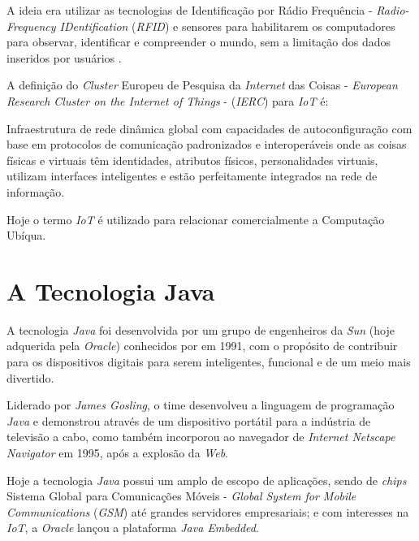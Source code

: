 A ideia era utilizar as tecnologias de Identificação por Rádio Frequência -
\textit{Radio-Frequency IDentification} (\textit{RFID}) e sensores para
habilitarem os computadores para observar, identificar e compreender o mundo,
sem a limitação dos dados inseridos por usuários \cite{kevinashton2009}.

\newpage
A definição do \textit{Cluster} Europeu de Pesquisa da \textit{Internet} das
Coisas - \textit{European Research Cluster on the Internet of Things} -
(\textit{IERC}) \cite[p. ~26]{iangsmith2012} para \textit{IoT} é:

\begin{citacao}
    Infraestrutura de rede dinâmica global com capacidades de autoconfiguração
    com base em protocolos de comunicação padronizados e interoperáveis onde as
    coisas físicas e virtuais têm identidades, atributos físicos,
    personalidades virtuais, utilizam interfaces inteligentes e estão
    perfeitamente integrados na rede de informação.
\end{citacao}

Hoje o termo \textit{IoT} é utilizado para relacionar comercialmente a
Computação Ubíqua.

\section{A Tecnologia Java}

A tecnologia \textit{Java} foi desenvolvida por um grupo de engenheiros da
\textit{Sun} (hoje adquerida pela \textit{Oracle}) conhecidos por
 em 1991, com o propósito de contribuir para os
dispositivos digitais para serem inteligentes, funcional e de um meio mais
divertido.

Liderado por \textit{James Gosling}, o time desenvolveu a linguagem de
programação \textit{Java} e demonstrou através de um dispositivo portátil para
a indústria de televisão a cabo, como também incorporou ao navegador de
\textit{Internet Netscape Navigator} em 1995, após a explosão da \textit{Web}.

Hoje a tecnologia \textit{Java} possui um amplo de escopo de aplicações, sendo
de \textit{chips} Sistema Global para Comunicações Móveis - \textit{Global
  System for Mobile Communications} (\textit{GSM}) até grandes servidores
empresariais; e com interesses na \textit{IoT}, a \textit{Oracle} lançou a
plataforma \textit{Java Embedded}.
